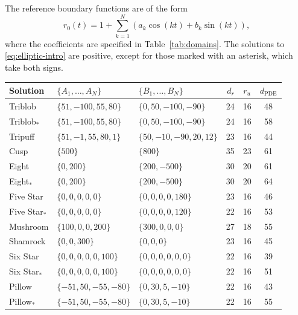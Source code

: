 \documentclass[11pt,a4paper]{amsart}
\begin{document}
The reference boundary functions are of the form
\[
r_0(t)
=
1+\sum_{k=1}^{N}
\left(a_k\cos(kt)+b_k\sin(kt)\right),
\]
where the coefficients are specified in Table~\ref{tab:domains}.  The solutions to \eqref{eq:elliptic-intro} are positive, except for those marked with an asterisk, which take both signs.

\begin{table}
	\centering\small
	\begin{tabular}{lllrcc}
		Solution & $\{A_1,\ldots,A_N\}$ & $\{B_1,\ldots,B_N\}$ & $d_r$ & $r_u$ & $d_\mathrm{PDE}$\\
		\hline
		Triblob
		& $\{51,-100,55,80\}$
		& $\{0,50,-100,-90\}$
		& 24&16&48\\
		
		Triblob$_*$
		& $\{51,-100,55,80\}$
		& $\{0,50,-100,-90\}$
		& 24&16&58\\
		
		Tripuff
		& $\{51,-1,55,80,1\}$
		& $\{50,-10,-90,20,12\}$
		& 23&16&44\\
		
		Cusp
		& $\{500\}$
		& $\{800\}$
		& 35&23&61\\
		
		Eight
		& $\{0,200\}$
		& $\{200,-500\}$
		& 30&20&61\\
		
		Eight$_*$
		& $\{0,200\}$
		& $\{200,-500\}$
		& 30&20&64\\
		
		Five Star
		& $\{0,0,0,0,0\}$
		& $\{0,0,0,0,180\}$
		& 23&16&46\\
		
		Five Star$_*$
		& $\{0,0,0,0,0\}$
		& $\{0,0,0,0,120\}$
		& 22&16&53\\
		
		Mushroom
		& $\{100,0,0,200\}$
		& $\{300,0,0,0\}$
		& 27&18&55\\
		
		Shamrock
		& $\{0,0,300\}$
		& $\{0,0,0\}$
		& 23&16&45\\
		
		Six Star
		& $\{0,0,0,0,0,100\}$
		& $\{0,0,0,0,0,0\}$
		& 22&16&39\\
		
		Six Star$_*$
		& $\{0,0,0,0,0,100\}$
		& $\{0,0,0,0,0,0\}$
		& 22&16&51\\
		
		Pillow
		& $\{-51,50,-55,-80\}$
		& $\{0,30,5,-10\}$
		& 22&16&43\\
		
		Pillow$_*$
		& $\{-51,50,-55,-80\}$
		& $\{0,30,5,-10\}$
		& 22&16&55\\
		

\end{tabular}
\end{table}
\end{document}
